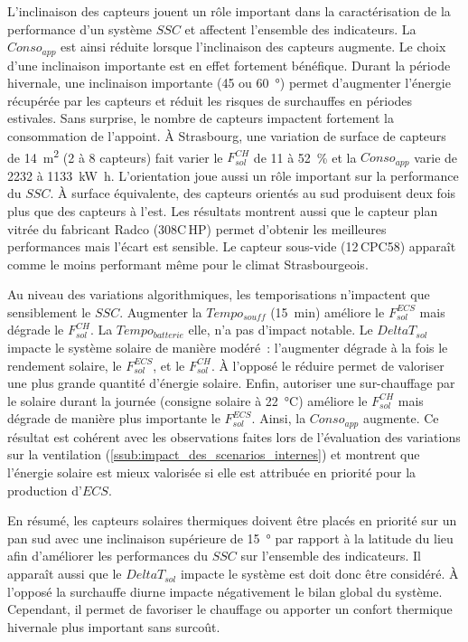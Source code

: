 L’inclinaison des capteurs jouent un rôle important dans la caractérisation de la
performance d’un système $SSC$ et affectent l’ensemble des indicateurs. La $Conso_{app}$
est ainsi réduite lorsque l’inclinaison des capteurs augmente. Le choix d’une inclinaison
importante est en effet fortement bénéfique. Durant la période hivernale, une inclinaison
importante (\num{45} ou \SI{60}{\degree}) permet d’augmenter l’énergie récupérée par les
capteurs et réduit les risques de surchauffes en périodes estivales. Sans surprise, le
nombre de capteurs impactent fortement la consommation de l’appoint. À Strasbourg, une
variation de surface de capteurs de \SI{14}{\meter\squared} (\num{2} à \num{8} capteurs)
fait varier le $F_{sol}^{CH}$ de \num{11} à \SI{52}{\percent} et la $Conso_{app}$ varie de
\num{2232} à \SI{1133}{\kilo\watt\hour}. L’orientation joue aussi un rôle important sur la
performance du $SSC$. À surface équivalente, des capteurs orientés au sud produisent deux
fois plus que des capteurs à l’est. Les résultats montrent aussi que le capteur plan vitrée du
fabricant Radco (308C\,HP) permet d’obtenir les meilleures performances mais l’écart est sensible. Le
capteur sous-vide (12\,CPC58) apparaît comme le moins performant même pour le climat Strasbourgeois.

Au niveau des variations algorithmiques, les temporisations n’impactent que sensiblement
le $SSC$. Augmenter la $Tempo_{souff}$ (\SI{15}{min}) améliore le $F_{sol}^{ECS}$ mais dégrade
le $F_{sol}^{CH}$. La $Tempo_{batterie}$ elle, n’a pas d’impact notable. Le $DeltaT_{sol}$
impacte le système solaire de manière modéré~: l’augmenter dégrade à la fois le rendement
solaire, le $F_{sol}^{ECS}$, et le $F_{sol}^{CH}$. À l’opposé le réduire permet de valoriser une plus
grande quantité d’énergie solaire. Enfin, autoriser une sur-chauffage par le solaire
durant la journée (consigne solaire à \SI{22}{\celsius}) améliore le $F_{sol}^{CH}$ mais dégrade
de manière plus importante le $F_{sol}^{ECS}$. Ainsi, la $Conso_{app}$ augmente. Ce résultat est
cohérent avec les observations faites lors de l’évaluation des variations sur la
ventilation (\ref{ssub:impact_des_scenarios_internes}) et montrent que l’énergie solaire
est mieux valorisée si elle est attribuée en priorité pour la production d’$ECS$.

En résumé, les capteurs solaires thermiques doivent être placés en priorité sur un pan sud
avec une inclinaison supérieure de \SI{15}{\degree} par rapport à la latitude du lieu afin
d’améliorer les performances du $SSC$ sur l’ensemble des indicateurs. Il apparaît aussi
que le $DeltaT_{sol}$ impacte le système est doit donc être considéré. À l’opposé la surchauffe
diurne impacte négativement le bilan global du système. Cependant, il permet de favoriser le
chauffage ou apporter un confort thermique hivernale plus important sans surcoût.





